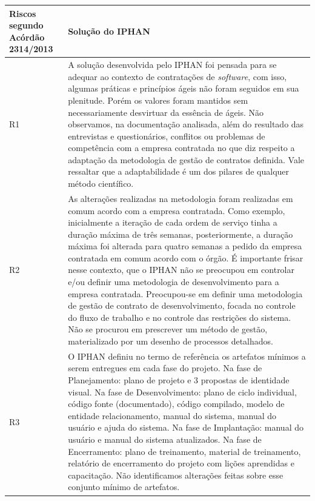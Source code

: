 \begin{longtable}{|p{2cm}|p{13cm}|}
\hline
\textbf{Riscos segundo Acórdão 2314/2013}                                                  & \textbf{Solução do IPHAN}                       \\ \hline
R1                                                                & A solução desenvolvida pelo IPHAN foi pensada para se adequar ao contexto de contratações de \textit{software}, com isso, algumas práticas e princípios ágeis não foram seguidos em sua plenitude. Porém os valores foram mantidos sem necessariamente desvirtuar da essência de ágeis. Não observamos, na documentação analisada, além do resultado das entrevistas e questionários, conflitos ou problemas de competência com a empresa contratada no que diz respeito a adaptação da metodologia de gestão de contratos definida. Vale ressaltar que a adaptabilidade é um dos pilares de qualquer método científico.          \\ \hline
R2                                                                &  As alterações realizadas na metodologia foram realizadas em comum acordo com a empresa contratada. Como exemplo, inicialmente a iteração de cada ordem de serviço tinha a duração máxima de três semanas, posteriormente, a duração máxima foi alterada para quatro semanas a pedido da empresa contratada em comum acordo com o órgão. É importante frisar nesse contexto, que o IPHAN não se preocupou em controlar e/ou definir uma metodologia de desenvolvimento para a empresa contratada. Preocupou-se em definir uma metodologia de gestão de contrato de desenvolvimento, focada no controle do fluxo de trabalho e no controle das restrições do sistema. Não se procurou em prescrever um método de gestão, materializado por um desenho de processos detalhados.               \\ \hline
R3                                                                & O IPHAN definiu no termo de referência os artefatos mínimos a serem entregues em cada fase do projeto. Na fase de Planejamento: plano de projeto e 3 propostas de identidade visual. Na fase de Desenvolvimento: plano de ciclo individual, código fonte (documentado), código compilado, modelo de entidade relacionamento, manual do sistema, manual do usuário e ajuda do sistema. Na fase de Implantação: manual do usuário e manual do sistema atualizados. Na fase de Encerramento: plano de treinamento, material de treinamento, relatório de encerramento do projeto com lições aprendidas e capacitação. Não identificamos alterações feitas sobre esse conjunto mínimo de artefatos.       \\ \hline

\end{longtable}
